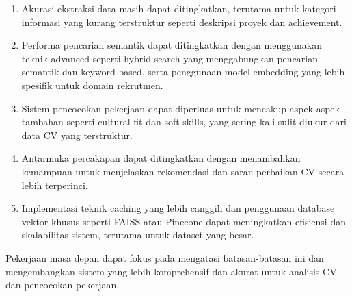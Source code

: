 \begin{enumerate}
\item Akurasi ekstraksi data masih dapat ditingkatkan, terutama untuk kategori informasi yang kurang terstruktur seperti deskripsi proyek dan achievement.

\item Performa pencarian semantik dapat ditingkatkan dengan menggunakan teknik advanced seperti hybrid search yang menggabungkan pencarian semantik dan keyword-based, serta penggunaan model embedding yang lebih spesifik untuk domain rekrutmen.

\item Sistem pencocokan pekerjaan dapat diperluas untuk mencakup aspek-aspek tambahan seperti cultural fit dan soft skills, yang sering kali sulit diukur dari data CV yang terstruktur.

\item Antarmuka percakapan dapat ditingkatkan dengan menambahkan kemampuan untuk menjelaskan rekomendasi dan saran perbaikan CV secara lebih terperinci.

\item Implementasi teknik caching yang lebih canggih dan penggunaan database vektor khusus seperti FAISS atau Pinecone dapat meningkatkan efisiensi dan skalabilitas sistem, terutama untuk dataset yang besar.
\end{enumerate}

Pekerjaan masa depan dapat fokus pada mengatasi batasan-batasan ini dan mengembangkan sistem yang lebih komprehensif dan akurat untuk analisis CV dan pencocokan pekerjaan.

